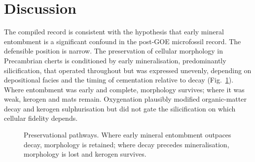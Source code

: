 \documentclass[11pt]{article}
\begin{document}
\section{Discussion}

The compiled record is consistent with the hypothesis that early mineral entombment is a
significant confound in the post-GOE microfossil record. The defensible position is narrow. The
preservation of cellular morphology in Precambrian cherts is conditioned by early mineralisation,
predominantly silicification, that operated throughout but was expressed unevenly, depending on
depositional facies and the timing of cementation relative to decay (Fig.~\ref{fig:model}). Where
entombment was early and complete, morphology survives; where it was weak, kerogen and mats remain.
Oxygenation plausibly modified organic-matter decay and kerogen sulphurisation
\citep{Lepot2009,Decraene2021} but did not gate the silicification on which cellular fidelity depends.

\begin{figure}[t]
\centering
{}
\caption{Preservational pathways. Where early mineral entombment outpaces decay, morphology is
retained; where decay precedes mineralisation, morphology is lost and kerogen survives.}
\label{fig:model}
\end{figure}
\end{document}
